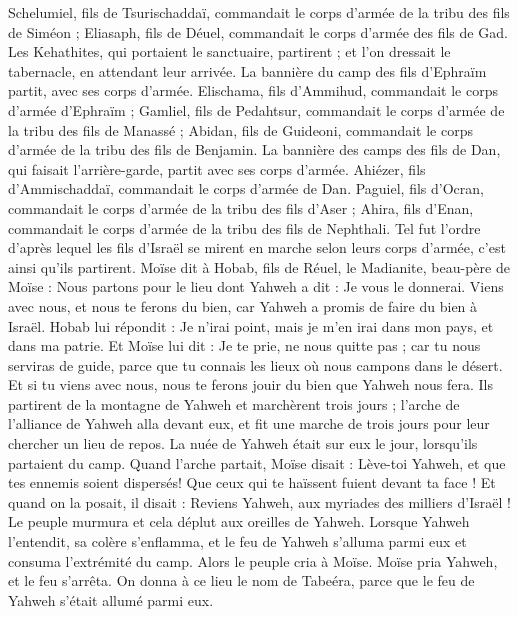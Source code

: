 \begin{multicols}{2}
Schelumiel, fils de Tsurischaddaï, commandait le corps d’armée de la tribu des fils de Siméon ;
Eliasaph, fils de Déuel, commandait le corps d’armée des fils de Gad.
Les Kehathites, qui portaient le sanctuaire, partirent ; et l’on dressait le tabernacle, en attendant leur arrivée.
La bannière du camp des fils d'Ephraïm partit, avec ses corps d’armée. Elischama, fils d’Ammihud, commandait le corps d’armée d'Ephraïm ;
Gamliel, fils de Pedahtsur, commandait le corps d’armée de la tribu des fils de Manassé ;
Abidan, fils de Guideoni, commandait le corps d’armée de la tribu des fils de Benjamin.
La bannière des camps des fils de Dan, qui faisait l'arrière-garde, partit avec ses corps d’armée. Ahiézer, fils d’Ammischaddaï, commandait le corps d’armée de Dan.
Paguiel, fils d’Ocran, commandait le corps d’armée de la tribu des fils d'Aser ;
Ahira, fils d’Enan, commandait le corps d’armée de la tribu des fils de Nephthali.
Tel fut l’ordre d’après lequel les fils d'Israël se mirent en marche selon leurs corps d’armée, c’est ainsi qu’ils partirent.
Moïse dit à Hobab, fils de Réuel, le Madianite, beau-père de Moïse : Nous partons pour le lieu dont Yahweh a dit : Je vous le donnerai. Viens avec nous, et nous te ferons du bien, car Yahweh a promis de faire du bien à Israël.
Hobab lui répondit : Je n’irai point, mais je m'en irai dans mon pays, et dans ma patrie.
Et Moïse lui dit : Je te prie, ne nous quitte pas ; car tu nous serviras de guide, parce que tu connais les lieux où nous campons dans le désert.
Et si tu viens avec nous, nous te ferons jouir du bien que Yahweh nous fera.
Ils partirent de la montagne de Yahweh et marchèrent trois jours ; l'arche de l'alliance de Yahweh alla devant eux, et fit une marche de trois jours pour leur chercher un lieu de repos.
La nuée de Yahweh était sur eux le jour, lorsqu’ils partaient du camp.
Quand l'arche partait, Moïse disait : Lève-toi Yahweh, et que tes ennemis soient dispersés! Que ceux qui te haïssent fuient devant ta face !
Et quand on la posait, il disait : Reviens Yahweh, aux myriades des milliers d'Israël !
\VerseOne{}Le peuple murmura et cela déplut aux oreilles de Yahweh. Lorsque Yahweh l'entendit, sa colère s'enflamma, et le feu de Yahweh s'alluma parmi eux et consuma l'extrémité du camp.
Alors le peuple cria à Moïse. Moïse pria Yahweh, et le feu s'arrêta.
On donna à ce lieu le nom de Tabeéra, parce que le feu de Yahweh s'était allumé parmi eux.

\end{multicols}
